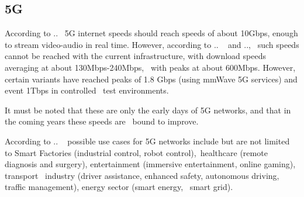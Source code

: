 
\subsection{5G}
\label{subsec:5g}
According to ..\ %
5G internet speeds should reach speeds of about 10Gbps, enough to stream video-audio in real time.
However, according to .. \ %
and ..,\ %
such speeds cannot be reached with the current infrastructure, with download speeds averaging at about 130Mbps-240Mbps, \
with peaks at about 600Mbps.
However, certain variants have reached peaks of 1.8 Gbps (using mmWave 5G services) and event 1Tbps in controlled \
test environments.

It must be noted that these are only the early days of 5G networks, and that in the coming years these speeds are \
bound to improve.

According to .. \ %
possible use cases for 5G networks include but are not limited to  Smart Factories (industrial control, robot control),\
 healthcare (remote diagnosis and surgery), entertainment (immersive entertainment, online gaming), transport \
industry (driver assistance, enhanced safety, autonomous driving, traffic management), energy sector (smart energy, \
smart grid).


